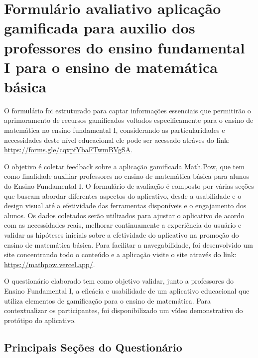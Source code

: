 \section{Formulário avaliativo  aplicação gamificada para auxilio dos professores do ensino fundamental I para o ensino de matemática básica}


O formulário foi estruturado para captar informações essenciais que permitirão o aprimoramento de recursos gamificados voltados especificamente para o ensino de matemática no ensino fundamental I, considerando as particularidades e necessidades deste nível educacional ele pode ser acessado atráves do link: \url{https://forms.gle/cqxpfYbaFTwmBVgSA}.


O objetivo é coletar feedback sobre a aplicação gamificada Math.Pow, que tem como finalidade auxiliar professores no ensino de matemática básica para alunos do Ensino Fundamental I. O formulário de avaliação é composto por várias seções que buscam abordar diferentes aspectos do aplicativo, desde a usabilidade e o design visual até a efetividade das ferramentas disponíveis e o engajamento dos alunos. Os dados coletados serão utilizados para ajustar o aplicativo de acordo com as necessidades reais, melhorar continuamente a experiência do usuário e validar as hipóteses iniciais sobre a efetividade do aplicativo na promoção do ensino de matemática básica. Para facilitar a navegabilidade, foi desenvolvido um site concentrando todo o conteúdo e a aplicação visite o site através do link: \url{https://mathpow.vercel.app/}.

O questionário elaborado tem como objetivo validar, junto a professores do Ensino Fundamental I, a eficácia e usabilidade de um aplicativo educacional que utiliza elementos de gamificação para o ensino de matemática. Para contextualizar os participantes, foi disponibilizado um vídeo demonstrativo do protótipo do aplicativo.

\subsection*{Principais Seções do Questionário}

